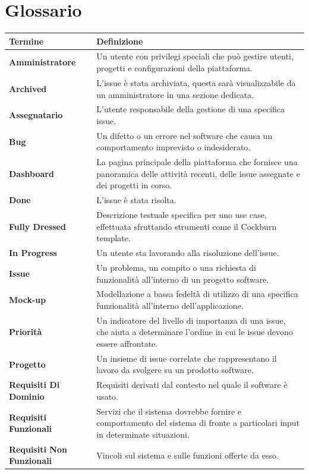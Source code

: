 \section{Glossario}

\begin{table}[H]
\begin{tabularx}{\textwidth}{|l|X|}
    \hline
    \textbf{Termine} & \textbf{Definizione} \\
    \hline
    \textbf{Amministratore} & Un utente con privilegi speciali che può gestire utenti, progetti e configurazioni della piattaforma. \\
    \hline
    \textbf{Archived} & L'issue è stata archiviata, questa sarà visualizzabile da un amministratore in una sezione dedicata. \\
    \hline
    \textbf{Assegnatario} & L'utente responsabile della gestione di una specifica issue. \\
    \hline
    \textbf{Bug} & Un difetto o un errore nel software che causa un comportamento imprevisto o indesiderato. \\
    \hline
    \textbf{Dashboard} & La pagina principale della piattaforma che fornisce una panoramica delle attività recenti, delle issue assegnate e dei progetti in corso. \\
    \hline
    \textbf{Done} & L'issue è stata risolta. \\
    \hline
    \textbf{Fully Dressed} & Descrizione testuale specifica per uno use case, effettuata sfruttando strumenti come il Cockburn template. \\
    \hline
    \textbf{In Progress} & Un utente sta lavorando alla risoluzione dell'issue. \\
    \hline
    \textbf{Issue} & Un problema, un compito o una richiesta di funzionalità all'interno di un progetto software. \\
    \hline
    \textbf{Mock-up} & Modellazione a bassa fedeltà di utilizzo di una specifica funzionalità all'interno dell'applicazione. \\
    \hline
    \textbf{Priorità} & Un indicatore del livello di importanza di una issue, che aiuta a determinare l'ordine in cui le issue devono essere affrontate. \\
    \hline
    \textbf{Progetto} & Un insieme di issue correlate che rappresentano il lavoro da svolgere su un prodotto software. \\
    \hline
    \textbf{Requisiti Di Dominio} & Requisiti derivati dal contesto nel quale il software è usato. \\
    \hline
    \textbf{Requisiti Funzionali} & Servizi che il sistema dovrebbe fornire e comportamento del sistema di fronte a particolari input in determinate situazioni. \\
    \hline
    \textbf{Requisiti Non Funzionali} & Vincoli sul sistema e sulle funzioni offerte da esso. \\
    \hline
\end{tabularx}
\end{table}

